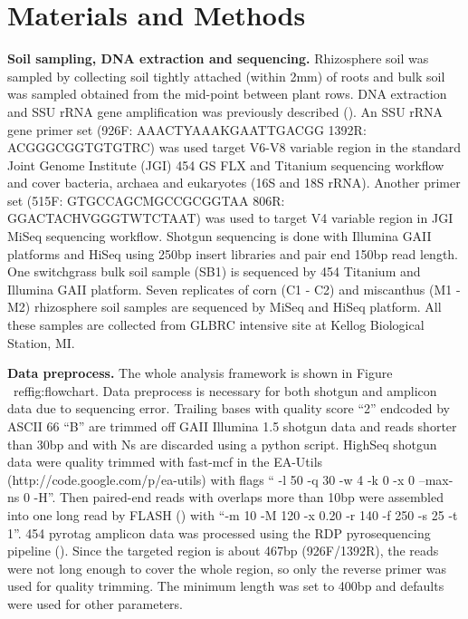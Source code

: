 \documentclass[12pt]{article}
\begin{document}
\section{Materials and Methods}
  {\bf Soil sampling, DNA extraction and sequencing. }
Rhizosphere soil was sampled by collecting soil tightly attached (within 2mm) of roots and bulk soil was sampled obtained from the mid-point between plant rows. DNA extraction and SSU rRNA gene amplification was previously described (\cite{ed2010}). An SSU rRNA gene primer set (926F: AAACTYAAAKGAATTGACGG 1392R: ACGGGCGGTGTGTRC) was used target V6-V8 variable region in the standard Joint Genome Institute (JGI) 454 GS FLX and Titanium sequencing workflow and cover bacteria, archaea and eukaryotes (16S and 18S rRNA). Another primer set (515F: GTGCCAGCMGCCGCGGTAA 806R: GGACTACHVGGGTWTCTAAT) was used to target V4 variable region in JGI MiSeq sequencing workflow. Shotgun sequencing is done with Illumina GAII platforms and HiSeq using 250bp insert libraries and pair end 150bp read length. One switchgrass bulk soil sample (SB1) is sequenced by 454 Titanium and Illumina GAII platform. Seven replicates of corn (C1 - C2) and miscanthus (M1 - M2) rhizosphere soil samples are sequenced by MiSeq and HiSeq platform. All these samples are collected from GLBRC intensive site at  Kellog Biological Station, MI.

  {\bf Data preprocess. }
  The whole analysis framework is shown in Figure ~ref{fig:flowchart}. Data preprocess is necessary for both shotgun and amplicon data due to sequencing error. Trailing bases with quality score ``2'' endcoded by ASCII 66 ``B'' are trimmed off GAII Illumina 1.5 shotgun data and reads shorter than 30bp and with Ns are discarded using a python script. HighSeq shotgun data were quality trimmed with fast-mcf in the EA-Utils (http://code.google.com/p/ea-utils) with flags `` -l 50 -q 30 -w 4 -k 0 -x 0 --max-ns 0 -H''. Then paired-end reads with overlaps more than 10bp were assembled into one long read by FLASH (\cite{flash2011}) with ``-m 10 -M 120 -x 0.20 -r 140 -f 250 -s 25 -t 1''. 454 pyrotag amplicon data was processed using the RDP pyrosequencing pipeline (\cite{rdp2009}). Since the targeted region is about 467bp (926F/1392R), the reads were not long enough to cover the whole region, so only the reverse primer was used for quality trimming. The minimum length was set to 400bp and defaults were used for other parameters.
\end{document}
